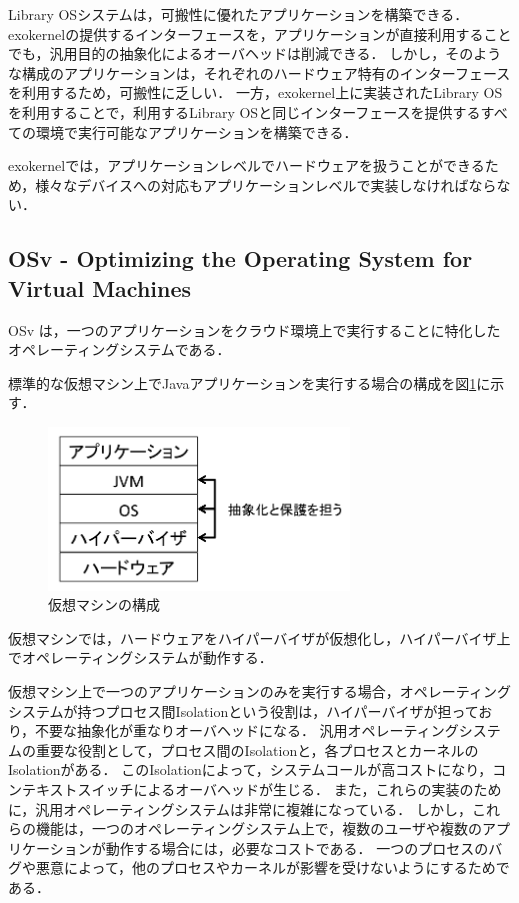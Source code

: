 \documentclass[graduation-thesis]{mlarticle}
\begin{document}
Library OSシステムは，可搬性に優れたアプリケーションを構築できる．
exokernelの提供するインターフェースを，アプリケーションが直接利用することでも，汎用目的の抽象化によるオーバヘッドは削減できる．
しかし，そのような構成のアプリケーションは，それぞれのハードウェア特有のインターフェースを利用するため，可搬性に乏しい．
一方，exokernel上に実装されたLibrary OSを利用することで，利用するLibrary OSと同じインターフェースを提供するすべての環境で実行可能なアプリケーションを構築できる．

exokernelでは，アプリケーションレベルでハードウェアを扱うことができるため，様々なデバイスへの対応もアプリケーションレベルで実装しなければならない．

\subsection {OSv - Optimizing the Operating System for Virtual Machines}
\label{relative:osv}
OSv は，一つのアプリケーションをクラウド環境上で実行することに特化したオペレーティングシステムである．

標準的な仮想マシン上でJavaアプリケーションを実行する場合の構成を図\ref{fig:vm}に示す．

\begin{figure}[H]
  \begin{center}
    \includegraphics[width=8.0cm]{images/vm.png}
    \caption{仮想マシンの構成}
    \label{fig:vm}
  \end{center}
\end{figure}

仮想マシンでは，ハードウェアをハイパーバイザが仮想化し，ハイパーバイザ上でオペレーティングシステムが動作する．

仮想マシン上で一つのアプリケーションのみを実行する場合，オペレーティングシステムが持つプロセス間Isolationという役割は，ハイパーバイザが担っており，不要な抽象化が重なりオーバヘッドになる．
汎用オペレーティングシステムの重要な役割として，プロセス間のIsolationと，各プロセスとカーネルのIsolationがある．
このIsolationによって，システムコールが高コストになり，コンテキストスイッチによるオーバヘッドが生じる．
また，これらの実装のために，汎用オペレーティングシステムは非常に複雑になっている．
しかし，これらの機能は，一つのオペレーティングシステム上で，複数のユーザや複数のアプリケーションが動作する場合には，必要なコストである．
一つのプロセスのバグや悪意によって，他のプロセスやカーネルが影響を受けないようにするためである．
\end{document}
